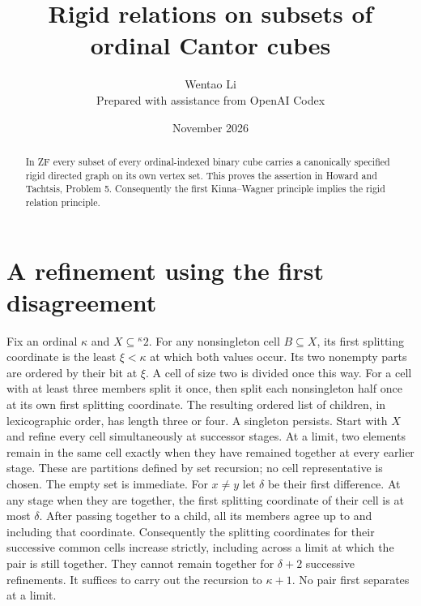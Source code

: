 \documentclass[11pt]{article}
\title{Rigid relations on subsets of ordinal Cantor cubes}
\author{Wentao Li\\[2pt]\small Prepared with assistance from OpenAI Codex}
\date{November 2026}
\begin{document}
\maketitle
\begin{abstract}
In ZF every subset of every ordinal-indexed binary cube carries a canonically specified rigid directed graph on its own vertex set. This proves the assertion in Howard and Tachtsis, Problem 5. Consequently the first Kinna--Wagner principle implies the rigid relation principle.
\end{abstract}
\section{A refinement using the first disagreement}
Fix an ordinal $\kappa$ and $X\subseteq{}^\kappa 2$. For any nonsingleton cell $B\subseteq X$, its first splitting coordinate is the least $\xi<\kappa$ at which both values occur. Its two nonempty parts are ordered by their bit at $\xi$. A cell of size two is divided once this way. For a cell with at least three members split it once, then split each nonsingleton half once at its own first splitting coordinate. The resulting ordered list of children, in lexicographic order, has length three or four. A singleton persists.
Start with $X$ and refine every cell simultaneously at successor stages. At a limit, two elements remain in the same cell exactly when they have remained together at every earlier stage. These are partitions defined by set recursion; no cell representative is chosen. The empty set is immediate.
For $x\ne y$ let $\delta$ be their first difference. At any stage when they are together, the first splitting coordinate of their cell is at most $\delta$. After passing together to a child, all its members agree up to and including that coordinate. Consequently the splitting coordinates for their successive common cells increase strictly, including across a limit at which the pair is still together. They cannot remain together for $\delta+2$ successive refinements. It suffices to carry out the recursion to $\kappa+1$. No pair first separates at a limit.
\end{document}
